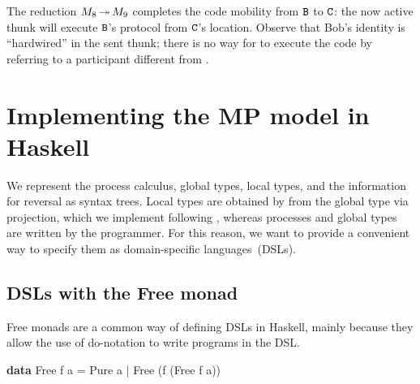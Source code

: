 \documentclass[runningheads,plain]{llncs}
\newcommand{\erase}[1]{\textcolor{orange}{#1}}
\newenvironment{Shaded}{}{}
\newcommand{\KeywordTok}[1]{\textcolor[rgb]{0.00,0.44,0.13}{\textbf{#1}}}
\newcommand{\DataTypeTok}[1]{\textcolor[rgb]{0.56,0.13,0.00}{#1}}
\newcommand{\FunctionTok}[1]{\textcolor[rgb]{0.02,0.16,0.49}{#1}}
\newcommand{\NormalTok}[1]{#1}
\begin{document}
The reduction $M_8 \textcolor{blue}{\,\twoheadrightarrow\,} M_9$ completes the code mobility from $\mathtt{B}$ to $\mathtt{C}$: the now active thunk
will execute $\mathtt{B}$'s protocol from $\mathtt{C}$'s location. Observe that Bob's identity \pB is ``hardwired'' in the sent thunk; 
there is no way for \pC to execute the code by referring to a participant different  from \pB.



\section{Implementing the MP model in Haskell}
\label{implementing-the-ppdp17-calculus-in-haskell}

We represent the process calculus, global types, local types, and the information for reversal as syntax trees. 
Local types are obtained by from the global type via projection, which we implement following , 
whereas processes and global types 
 are written by the programmer. For this reason, we want to provide a convenient way to specify them as domain-specific languages~(DSLs). 

\subsection{DSLs with the Free monad}

Free monads are a common way of defining DSLs in Haskell, mainly because they allow the use of do-notation to write programs in the DSL.
\begin{Shaded}
\begin{Highlighting}[]
\KeywordTok{data} \DataTypeTok{Free}\NormalTok{ f a   }
    \FunctionTok{=} \DataTypeTok{Pure}\NormalTok{ a    }
    \FunctionTok{|} \DataTypeTok{Free}\NormalTok{ (f (}\DataTypeTok{Free}\NormalTok{ f a))   }
\end{Highlighting}
\end{Shaded}
\end{document}
